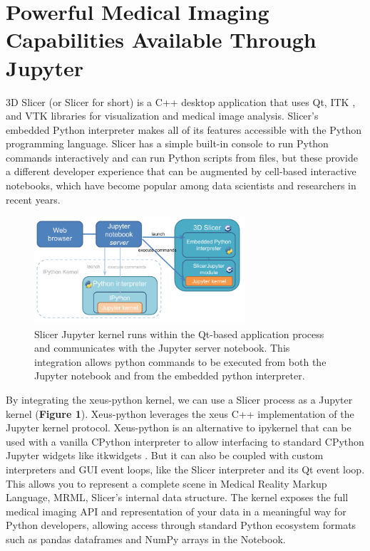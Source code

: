 \documentclass{IEEEcsmag}
\begin{document}
\section{Powerful Medical Imaging Capabilities Available Through Jupyter}

3D Slicer \cite{fedorov_3d_2012} (or Slicer for short) is a C++ desktop application that uses Qt, ITK \cite{yoo_engineering_2002}, and VTK \cite{Schroeder+Martin+Lorensen+Sobierajski+Avila+Law1998} libraries for visualization and medical image analysis. Slicer’s embedded Python interpreter makes all of its features accessible with the Python programming language. Slicer has a simple built-in console to run Python commands interactively and can run Python scripts from files, but these provide a different developer experience that can be augmented by  cell-based interactive notebooks, which have become popular among data scientists and researchers in recent years.

\begin{figure}
\centerline{\includegraphics[width=18.5pc]{figure1_kernel_integration.png}}
\caption{Slicer Jupyter kernel runs within the Qt-based application process and communicates with the Jupyter server notebook. This integration allows python commands to be executed from both the Jupyter notebook and from the embedded python interpreter.}
\end{figure}

By integrating the xeus-python kernel, we can use a Slicer process as a Jupyter kernel ({\bf Figure 1}). Xeus-python leverages the xeus C++ implementation of the Jupyter kernel protocol. Xeus-python is an alternative to ipykernel that can be used with a vanilla CPython interpreter to allow interfacing to standard CPython Jupyter widgets like itkwidgets \cite{https://zenodo.org/record/3603358}. But it can also be coupled with custom interpreters and GUI event loops, like the Slicer interpreter and its Qt event loop. This allows you to represent a complete scene in Medical Reality Markup Language, MRML, Slicer’s internal data structure. The kernel exposes the full medical imaging API and representation of your data in a meaningful way for Python developers, allowing access through standard Python ecosystem formats such as pandas dataframes and NumPy arrays in the Notebook.
\end{document}
